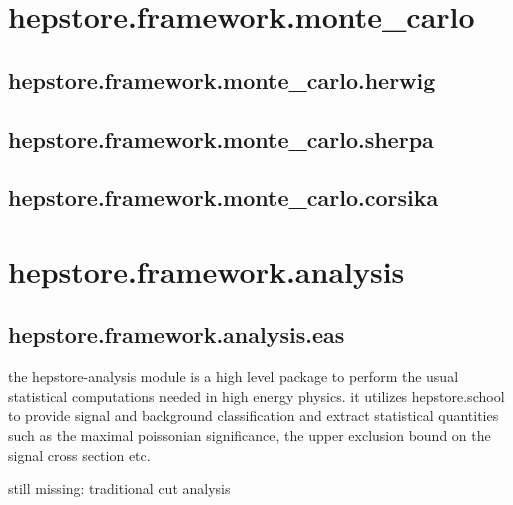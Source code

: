 

\section{hepstore.framework.monte\_carlo}
\subsection{hepstore.framework.monte\_carlo.herwig}
\subsection{hepstore.framework.monte\_carlo.sherpa}
\subsection{hepstore.framework.monte\_carlo.corsika}

\section{hepstore.framework.analysis}
\subsection{hepstore.framework.analysis.eas}

the hepstore-analysis module is a high level package to perform the
usual statistical computations needed in high energy physics. it
utilizes hepstore.school to provide signal and background
classification and extract statistical quantities such as the maximal
poissonian significance, the upper exclusion bound on the signal cross
section etc.

still missing: traditional cut analysis
